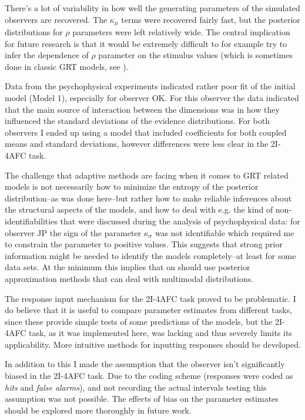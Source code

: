 \documentclass{article}\usepackage{knitr}
\begin{document}
There's a lot of variability in how well the generating parameters of the simulated observers are recovered. The $\kappa_{\mu}$ terms were recovered fairly fast, but the posterior distributions for $\rho$ parameters were left relatively wide. The central implication for future research is that it would be extremely difficult to for example try to infer the dependence of $\rho$ parameter on the stimulus values (which is sometimes done in classic GRT  models, see \citet{ashby2015, soto2017}). 
 
Data from the psychophysical experiments indicated rather poor fit of the initial model (Model 1), especially for observer OK. For this observer the data indicated that the main source of interaction between the dimensions was in how they influenced the standard deviations of the evidence distributions. For both observers I ended up using a model that included coefficients for both coupled means and standard deviations, however differences were less clear in the 2I-4AFC task.

The challenge that adaptive methods are facing when it comes to GRT related models is not necessarily how to minimize the entropy of the posterior distribution--as was done here--but rather how to make reliable inferences about the structural aspects of the models, and how to deal with e.g. the kind of non-identifiabilities that were discussed during the analysis of psychophysical data: for observer JP the sign of the parameter $\kappa_{\sigma}$ was not identifiable which required me to constrain the parameter to positive values. This suggests that strong prior information might be needed to identify the models completely--at least for some data sets. At the minimum this implies that on should use posterior approximation methods that can deal with multimodal distributions. 

The response input mechanism for the 2I-4AFC task proved to be problematic. I do believe that it is useful to compare parameter estimates from different tasks, since these provide  simple tests of  some predictions of the models, but the 2I-4AFC task, as it was implemented  here, was lacking and thus severely limits its applicability. More intuitive methods for inputting responses should be developed. 

In addition to this I made the assumption that the observer isn't significantly biased in the 2I-4AFC task. Due to the coding scheme (responses were coded as \textit{hits} and \textit{false alarms}), and not recording the actual intervals testing this assumption was not possible. The effects of bias on the parameter estimates should be explored more thoroughly in future work.
\end{document}
